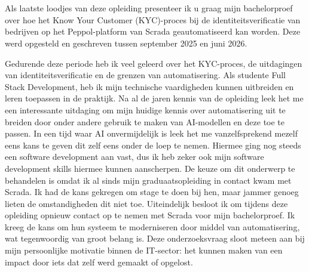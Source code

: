 
\chapter*{}%
\label{ch:voorwoord}


Als laatste loodjes van deze opleiding presenteer ik u graag mijn bachelorproef over hoe het Know Your Customer (KYC)-proces bij de identiteitsverificatie van bedrijven op het Peppol-platform van Scrada geautomatiseerd kan worden. 
Deze werd opgesteld en geschreven tussen september 2025 en juni 2026.

Gedurende deze periode heb ik veel geleerd over het KYC-proces, de uitdagingen van identiteitsverificatie en de grenzen van automatisering. 
Als studente Full Stack Development, heb ik mijn technische vaardigheden kunnen uitbreiden en leren toepassen in de praktijk.
Na al de jaren kennis van de opleiding leek het me een interessante uitdaging om mijn huidige kennis over automatisering uit te breiden door onder andere gebruik te maken van AI-modellen en deze toe te passen.
In een tijd waar AI onvermijdelijk is leek het me vanzelfsprekend mezelf eens kans te geven dit zelf eens onder de loep te nemen. Hiermee ging nog steeds een software development aan vast,
dus ik heb zeker ook mijn software development skills hiermee kunnen aanscherpen. De keuze om dit onderwerp te behandelen is omdat ik al sinds mijn graduaatsopleiding in contact kwam met Scrada.
Ik had de kans gekregen om stage te doen bij hen, maar jammer genoeg lieten de omstandigheden dit niet toe. Uiteindelijk besloot ik om tijdens deze opleiding opnieuw contact op te nemen met Scrada voor mijn bachelorproef. 
Ik kreeg de kans om hun systeem te moderniseren door middel van automatisering, wat tegenwoordig van groot belang is. 
Deze onderzoeksvraag sloot meteen aan bij mijn persoonlijke motivatie binnen de IT-sector: het kunnen maken van een impact door iets dat zelf werd gemaakt of opgelost.

\medskip

